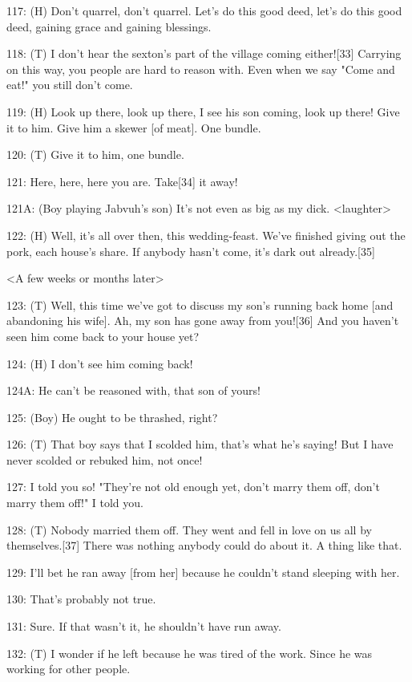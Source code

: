 {117: (H) Don't quarrel, don't quarrel. Let's do this good deed, let's do
this good deed, gaining grace and gaining blessings.}

{118: (T) I don't hear the sexton's part of the village coming either![33]
Carrying on this way, you people are hard to reason with. Even when we say "Come
and eat!" you still don't come. }

{119: (H) Look up there, look up there, I see his son coming, look up there!
Give it to him. Give him a skewer [of meat]. One bundle. }

{120: (T) Give it to him, one bundle.}

{121: Here, here, here you are. Take[34] it away! }

{121A: (Boy playing Jabvuh's son) It's not even as big as my dick. <laughter>}

{122: (H) Well, it's all over then, this wedding-feast. We've finished giving
out the pork, each house's share. If anybody hasn't come, it's dark out already.[35]}

\begin{center}
{<A few weeks or months later>}
\end{center}

\leftskip=0pt
{123: (T) Well, this time we've got to discuss my son's running back home
[and abandoning his wife]. Ah, my son has gone away from you![36] And you haven't
seen him come back to your house yet?}

{124: (H) I don't see him coming back!}

{124A: He can't be reasoned with, that son of yours!}

{125: (Boy) He ought to be thrashed, right?}

{126: (T) That boy says that I scolded him, that's what he's saying! But
I have never scolded or rebuked him, not once!}

{127: I told you so! "They're not old enough yet, don't marry them
off, don't marry them off!" I told you.}

{128: (T) Nobody married them off. They went and fell in love on us all
by themselves.[37] There was nothing anybody could do about it. A thing like that.}

{129: I'll bet he ran away [from her] because he couldn't stand sleeping
with her.}

{130: That's probably not true.}

{131: Sure. If that wasn't it, he shouldn't have run away.}

{132: (T) I wonder if he left because he was tired of the work. Since he
was working for other people.}

